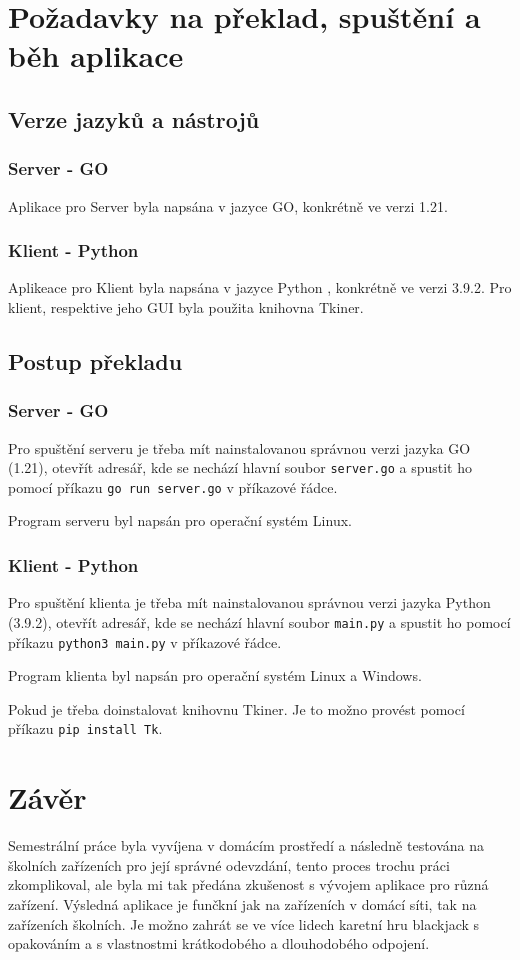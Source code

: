 \documentclass{article}
\begin{document}
\section{Požadavky na překlad, spuštění a běh aplikace}
\subsection{Verze jazyků a nástrojů}

\subsubsection{Server - GO}

Aplikace pro Server byla napsána v jazyce GO, konkrétně ve verzi 1.21.

\subsubsection{Klient - Python}

Aplikeace pro Klient byla napsána v jazyce Python , konkrétně ve verzi 3.9.2. Pro klient, respektive jeho GUI byla použita knihovna Tkiner.

\subsection{Postup překladu}

\subsubsection{Server - GO}

Pro spuštění serveru je třeba mít nainstalovanou správnou verzi jazyka GO (1.21), otevřít adresář, kde se nechází hlavní soubor \texttt{server.go} a spustit ho pomocí příkazu \texttt{go run server.go} v příkazové řádce.

Program serveru byl napsán pro operační systém Linux.

\subsubsection{Klient - Python}

Pro spuštění klienta je třeba mít nainstalovanou správnou verzi jazyka Python (3.9.2), otevřít adresář, kde se nechází hlavní soubor \texttt{main.py} a spustit ho pomocí příkazu \texttt{python3 main.py} v příkazové řádce.

Program klienta byl napsán pro operační systém Linux a Windows.

Pokud je třeba doinstalovat knihovnu Tkiner. Je to možno provést pomocí příkazu \texttt{pip install Tk}.

\section{Závěr}
Semestrální práce byla vyvíjena v domácím prostředí a následně testována na školních zařízeních pro její správné odevzdání, tento proces trochu práci zkomplikoval, ale byla mi tak předána zkušenost s vývojem aplikace pro různá zařízení. Výsledná aplikace je funčkní jak na zařízeních v domácí síti, tak na zařízeních školních. Je možno zahrát se ve více lidech karetní hru blackjack s opakováním a s vlastnostmi krátkodobého a dlouhodobého odpojení.
\end{document}
